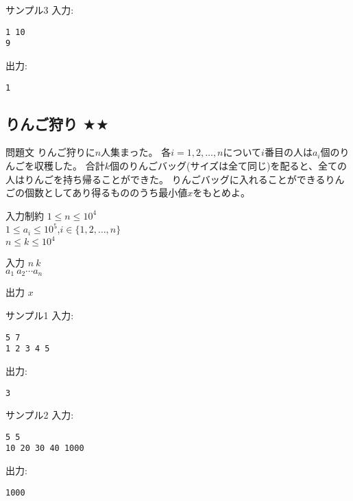 \documentclass[a4paper,twoside,onecolumn,openany,article,10pt]{memoir}
\theoremstyle{remark}
\begin{document}
\begin{itembox}[l]{サンプル3}
入力:
\begin{verbatim}
1 10
9
\end{verbatim}
出力:
\begin{verbatim}
1
\end{verbatim}
\end{itembox}

\clearpage
\subsection{りんご狩り $\bigstar\bigstar$}
\begin{itembox}[l]{問題文}
りんご狩りに$n$人集まった。
各$i=1,2,\dotsc,n$について$i$番目の人は$a_i$個のりんごを収穫した。
合計$k$個のりんごバッグ(サイズは全て同じ)を配ると、全ての人はりんごを持ち帰ることができた。
りんごバッグに入れることができるりんごの個数としてあり得るもののうち最小値$x$をもとめよ。
\end{itembox}

\begin{itembox}[l]{入力制約}
$1\le n\le 10^4$\\
$1\le a_i\le 10^5$,\hspace{2em}$i\in\{1,2,\dotsc,n\}$\\
$n\le k\le 10^4$
\end{itembox}

\begin{itembox}[l]{入力}
$n~k$\\
$a_1~a_2 \dotsb a_n$
\end{itembox}

\begin{itembox}[l]{出力}
$x$
\end{itembox}

\begin{itembox}[l]{サンプル1}
入力:
\begin{verbatim}
5 7
1 2 3 4 5
\end{verbatim}
出力:
\begin{verbatim}
3
\end{verbatim}
\end{itembox}

\begin{itembox}[l]{サンプル2}
入力:
\begin{verbatim}
5 5
10 20 30 40 1000
\end{verbatim}
出力:
\begin{verbatim}
1000
\end{verbatim}
\end{itembox}
\end{document}
